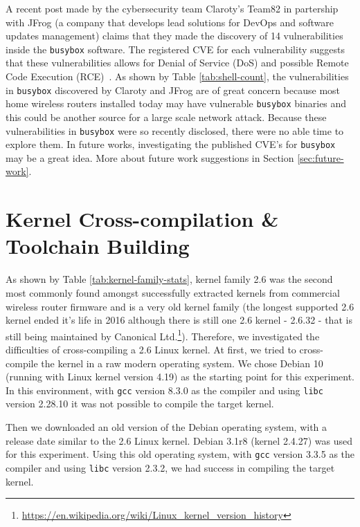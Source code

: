 A recent post made by the cybersecurity team Claroty’s Team82 in partership with JFrog (a company that develops lead solutions for DevOps and software updates management) claims that they made the discovery of 14 vulnerabilities inside the {\tt busybox} software. The registered CVE for each vulnerability suggests that these vulnerabilities allows for Denial of Service (DoS) and possible Remote Code Execution (RCE)~\cite{jfrog-busybox}. As shown by Table \ref{tab:shell-count}, the vulnerabilities in {\tt busybox} discovered by Claroty and JFrog are of great concern because most home wireless routers installed today may have vulnerable {\tt busybox} binaries and this could be another source for a large scale network attack. Because these vulnerabilities in {\tt busybox} were so recently disclosed, there were no able time to explore them. In future works, investigating the published CVE's for {\tt busybox} may be a great idea. More about future work suggestions in Section \ref{sec:future-work}.

\section{Kernel Cross-compilation \& Toolchain Building}

As shown by Table \ref{tab:kernel-family-stats}, kernel family 2.6 was the second most commonly found amongst successfully extracted kernels from commercial wireless router firmware and is a very old kernel family (the longest supported 2.6 kernel ended it's life in 2016 although there is still one 2.6 kernel - 2.6.32 - that is still being maintained by Canonical Ltd.\footnote{\url{https://en.wikipedia.org/wiki/Linux_kernel_version_history}}). Therefore, we investigated the difficulties of cross-compiling a 2.6 Linux kernel. At first, we tried to cross-compile the kernel in a raw modern operating system. We chose Debian 10 (running with Linux kernel version 4.19) as the starting point for this experiment. In this environment, with {\tt gcc} version 8.3.0 as the compiler and using {\tt libc} version 2.28.10 it was not possible to compile the target kernel.

Then we downloaded an old version of the Debian operating system, with a release date similar to the 2.6 Linux kernel. Debian 3.1r8 (kernel 2.4.27) was used for this experiment. Using this old operating system, with {\tt gcc} version 3.3.5 as the compiler and using {\tt libc} version 2.3.2, we had success in compiling the target kernel.


